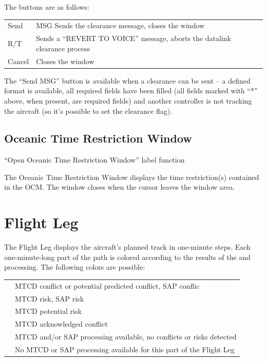 \documentclass[a4paper,oneside,11pt]{memoir}
\begin{document}
The buttons are as follows:

\begin{longtable}{p{2.5cm} p{10cm}}
  Send    & MSG Sends the clearance message, closes the window\\
  R/T     & Sends a “REVERT TO VOICE” message, aborts the datalink clearance process\\
  Cancel  & Closes the window\\
\end{longtable}

The “Send MSG” button is available when a clearance can be sent – a defined format is available, all required fields have been filled (all fields marked with “*” above, when present, are required fields) and another controller is not tracking the aircraft (so it’s possible to set the clearance flag).

\subsection{Oceanic Time Restriction Window}\label{win:otrw}

“Open Oceanic Time Restriction Window” label function


The Oceanic Time Restriction Window displays the time restriction(s) contained in the OCM. The window closes when the cursor leaves the window area.

\section{Flight Leg}

The Flight Leg displays the aircraft’s planned track in one-minute steps. Each one-minute-long part of the
path is colored according to the results of the  and  processing. The following colors are possible:

\bigskip

\begin{longtable}{p{2.5cm} p{10cm}}
{Urgency FL}      & MTCD conflict or potential predicted conflict, SAP conflic\\
{Warning FL}      & MTCD risk, SAP risk\\
{Potential FL}    & MTCD potential risk\\
{Conflict Ack FL} & MTCD acknowledged conflict\\
{Information FL}  & MTCD and/or SAP processing available, no conflicts or risks detected\\
{Flight Leg}      & No MTCD or SAP processing available for this part of the Flight Leg\\
\end{longtable}
\end{document}
